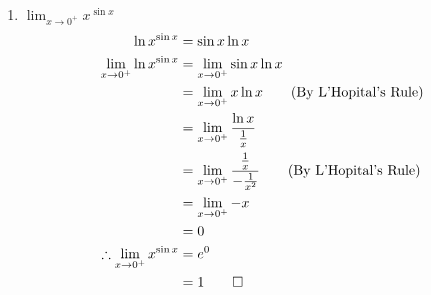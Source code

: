 \documentclass[12pt, a4paper]{article}
\begin{document}
\begin{enumerate}[Q\arabic*.]
\begin{enumerate}[(\alph*)]
     \item $\displaystyle \lim_{x\to0^+}x^{\sin x}$
       \begin{align*}
         \ln x^{\sin x} &= \sin x \ln x \\
         \lim_{x\to0^+}\ln x^{\sin x} &= \lim_{x\to0^+}\sin x\ln x\\
                                      &= \lim_{x\to0^+}x\ln x\tag*{\text{(By L'Hopital's Rule)}}\\
                                      &= \lim_{x\to0^+}\frac{\ln x}{\frac{1}{x}}\\
                                      &= \lim_{x\to0^+}\frac{\frac{1}{x}}{-\frac{1}{x^2}}\tag*{\text{(By L'Hopital's Rule)}}\\
                                      &= \lim_{x\to0^+}-x\\
                                      &= 0\\
         \therefore \lim_{x\to0^+}x^{\sin x} &= e^0\\
                                             &= 1\qed
       \end{align*}
    \end{enumerate}
\end{enumerate}
\end{document}
